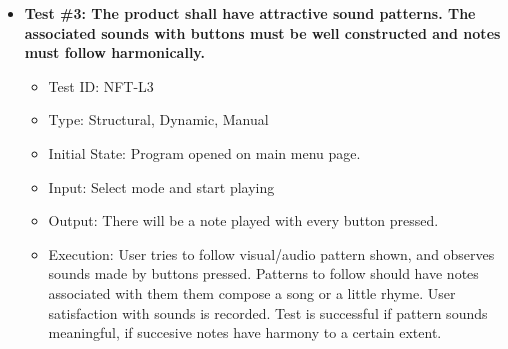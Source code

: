 \documentclass[12pt, titlepage]{article}
\begin{document}
\begin{itemize}
\item \textbf{Test \#3: The product shall have attractive sound patterns. The associated sounds with buttons must be well constructed and notes must follow harmonically.}
\begin{itemize}
\item Test ID: NFT-L3
\item Type: Structural, Dynamic, Manual				
\item Initial State: Program opened on main menu page.		
\item Input: Select mode and start playing
\item Output: There will be a note played with every button pressed.	
\item Execution: User tries to follow visual/audio pattern shown, and observes sounds made by buttons pressed. Patterns to follow should have notes associated with them them compose a song or a little rhyme. User satisfaction with sounds is recorded. Test is successful if pattern sounds meaningful, if succesive notes have harmony to a certain extent.
\end{itemize}
\end{itemize}
\end{document}
